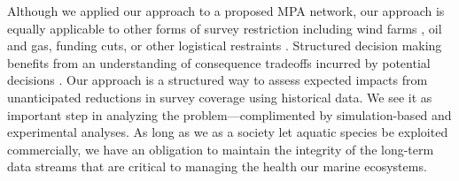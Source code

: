 \documentclass[12pt]{article}
\begin{document}
Although we applied our approach to a proposed MPA network, our approach is equally applicable to other forms of survey restriction including wind farms \citep{hare2022}, oil and gas, funding cuts, or other logistical restraints \citep{ices2023}.
Structured decision making benefits from an understanding of consequence tradeoffs incurred by potential decisions \citep{gregory2012}.
Our approach is a structured way to assess expected impacts from unanticipated reductions in survey coverage using historical data.
We see it as important step in analyzing the problem---complimented by simulation-based and experimental analyses.
As long as we as a society let aquatic species be exploited commercially, we have an obligation to maintain the integrity of the long-term data streams that are critical to managing the health our marine ecosystems.



\end{document}
